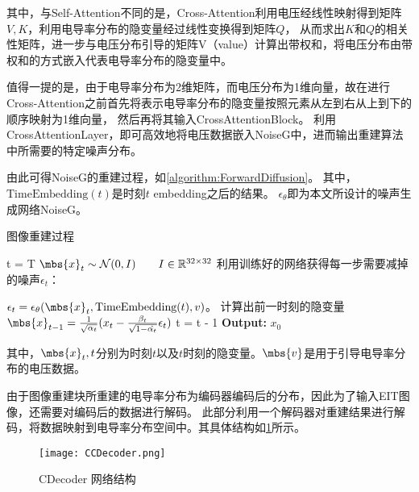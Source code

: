 其中，与Self-Attention不同的是，Cross-Attention利用电压经线性映射得到矩阵$V, K$，利用电导率分布的隐变量经过线性变换得到矩阵$Q$，
从而求出$K$和$Q$的相关性矩阵，进一步与电压分布引导的矩阵V（value）计算出带权和，将电压分布由带权和的方式嵌入代表电导率分布的隐变量中。

值得一提的是，由于电导率分布为2维矩阵，而电压分布为1维向量，故在进行Cross-Attention之前首先将表示电导率分布的隐变量按照元素从左到右从上到下的顺序映射为1维向量，
然后再将其输入CrossAttentionBlock。
利用CrossAttentionLayer，即可高效地将电压数据嵌入NoiseG中，进而输出重建算法中所需要的特定噪声分布。

由此可得NoiseG的重建过程，如\cref{algorithm:ForwardDiffusion}。
其中，$\text{TimeEmbedding}(t)$是时刻$t$ embedding之后的结果。
$\epsilon_\theta$即为本文所设计的噪声生成网络NoiseG。
\begin{algorithm}[H]
    
    \caption{图像重建过程}
    \begin{algorithmic}[1]

        \State t = T
        \State $\mbs{x}_t \sim \mathcal{N}(0, I) \qquad I \in \mathbb{R}^{32 \times 32}$
        \State 利用训练好的网络获得每一步需要减掉的噪声$\epsilon_t$：
        
        $\epsilon_t = \epsilon_\theta(\mbs{x}_t, \text{TimeEmbedding}(t), v)$。
        \State 计算出前一时刻的隐变量$\mbs{x}_{t-1} = \frac{1}{\sqrt{\alpha_t}}(x_t - \frac{\beta_t}{\sqrt{1-\hat{\alpha_t}}}\epsilon_t)$
        \State t = t - 1
        \EndWhile
        \State \textbf{Output:} $x_0$
    \end{algorithmic}
    \label{algorithm:ForwardDiffusion}
\end{algorithm}

其中，$\mbs{x}_t, t$分别为时刻$t$以及$t$时刻的隐变量。$\mbs{v}$是用于引导电导率分布的电压数据。




由于图像重建块所重建的电导率分布为编码器编码后的分布，因此为了输入EIT图像，还需要对编码后的数据进行解码。
此部分利用一个解码器对重建结果进行解码，将数据映射到电导率分布空间中。其具体结构如\cref{figure:CCDecoder}所示。
\begin{figure}[h]
    \centering
    \texttt{[image: CCDecoder.png]}
    \caption{CDecoder 网络结构}
    \label{figure:CCDecoder}
\end{figure}



